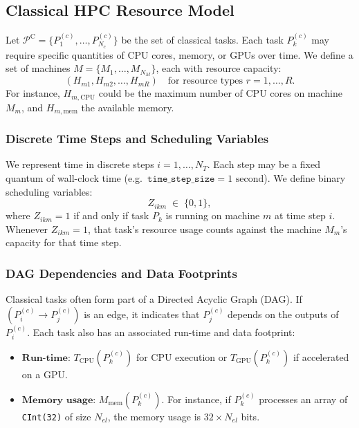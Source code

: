 \documentclass{article}
\newcommand{\aset}[1]{{{{#1}}}}       %
\begin{document}
\subsection{Classical HPC Resource Model}
Let \(\mathcal{P}^{\mathrm{C}} = \{P_1^{(c)}, \dots, P_{N_c}^{(c)}\}\) be the set of classical tasks. Each task \(P_k^{(c)}\) may require specific quantities of CPU cores, memory, or GPUs over time. We define a set of machines \(\aset{M} = \{M_1,\ldots,M_{N_M}\}\), each with resource capacity:
\[
(H_{m1}, H_{m2},\dots,H_{mR})\quad
\text{for resource types } r = 1,\dots,R.
\]
For instance, \(H_{m,\mathrm{CPU}}\) could be the maximum number of CPU cores on machine \(M_m\), and \(H_{m,\mathrm{mem}}\) the available memory.


\subsubsection{Discrete Time Steps and Scheduling Variables}
We represent time in discrete steps \(i = 1,\dots,N_T\). Each step may be a fixed quantum of wall-clock time (e.g.\ \(\texttt{time\_step\_size} = 1 \text{ second}\)). We define binary scheduling variables:
\[
Z_{ikm} \;\in\; \{0,1\},
\]
where \(Z_{ikm} = 1\) if and only if task \(P_k\) is running on machine \(m\) at time step \(i\). Whenever \(Z_{ikm} = 1\), that task’s resource usage counts against the machine \(M_m\)’s capacity for that time step.

\subsubsection{DAG Dependencies and Data Footprints}
Classical tasks often form part of a Directed Acyclic Graph (DAG). If \((P_i^{(c)} \to P_j^{(c)})\) is an edge, it indicates that \(P_j^{(c)}\) depends on the outputs of \(P_i^{(c)}\). Each task also has an associated run-time and data footprint:
\begin{itemize}
  \item \(\textbf{Run-time:}\) \(T_{\mathrm{CPU}}(P_k^{(c)})\) for CPU execution or \(T_{\mathrm{GPU}}(P_k^{(c)})\) if accelerated on a GPU.
  \item \(\textbf{Memory usage:}\) \(M_{\mathrm{mem}}(P_k^{(c)})\). For instance, if \(P_k^{(c)}\) processes an array of \texttt{CInt(32)} of size \(N_{el}\), the memory usage is \(32 \times N_{el}\) bits.
\end{itemize}
\end{document}
